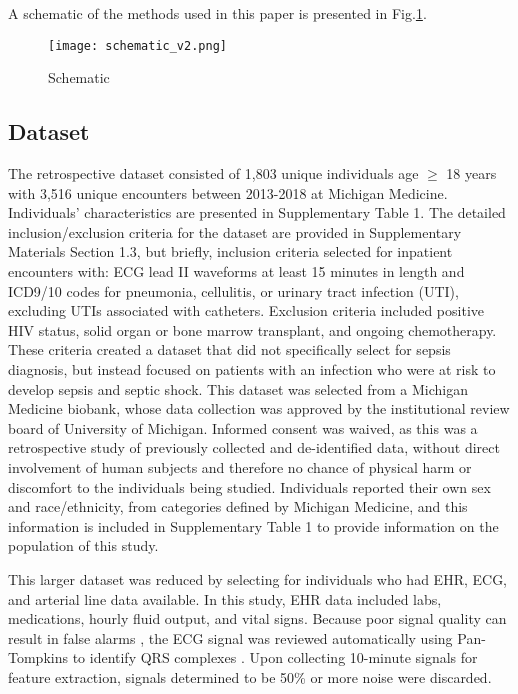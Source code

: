 
A schematic of the methods used in this paper is presented in Fig.\ref{fig:schematic}.

\begin{figure}[htb]
    \centering
    \texttt{[image: schematic\_v2.png]}
    \caption{Schematic}
    \label{fig:schematic}
\end{figure}

\subsection*{Dataset} \label{sec:methods_dataset}

The retrospective dataset consisted of 1,803 unique individuals age $\geq$ 18 years with 3,516 unique encounters between 2013-2018 at Michigan Medicine. Individuals' characteristics are presented in Supplementary Table 1. The detailed inclusion/exclusion criteria for the dataset are provided in Supplementary Materials Section 1.3, but briefly, inclusion criteria selected for inpatient encounters with: ECG lead II waveforms at least 15 minutes in length and ICD9/10 codes for pneumonia, cellulitis, or urinary tract infection (UTI), excluding UTIs associated with catheters. Exclusion criteria included positive HIV status, solid organ or bone marrow transplant, and ongoing chemotherapy. These criteria created a dataset that did not specifically select for sepsis diagnosis, but instead focused on patients with an infection who were at risk to develop sepsis and septic shock. This dataset was selected from a Michigan Medicine biobank, whose data collection was approved by the institutional review board of University of Michigan. Informed consent was waived, as this was a retrospective study of previously collected and de-identified data, without direct involvement of human subjects and therefore no chance of physical harm or discomfort to the individuals being studied. Individuals reported their own sex and race/ethnicity, from categories defined by Michigan Medicine, and this information is included in Supplementary Table 1 to provide information on the population of this study.

This larger dataset was reduced by selecting for individuals who had EHR, ECG, and arterial line data available. In this study, EHR data included labs, medications, hourly fluid output, and vital signs. Because poor signal quality can result in false alarms \autocite{gambarotta_review_2016}, the ECG signal was reviewed automatically using Pan-Tompkins to identify QRS complexes \autocite{pantom_1985, matlab-pantom}. Upon collecting 10-minute signals for feature extraction, signals determined to be 50\% or more noise were discarded.

